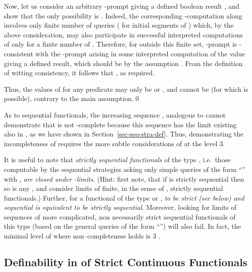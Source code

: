 \documentclass[fleqn]{LMCS}
\theoremstyle{plain}\newtheorem{satz}[thm]{Satz}
\theoremstyle{plain}\newtheorem{hyp}[thm]{Hypothesis}
\theoremstyle{plain}\newtheorem{hyps}[thm]{Hypotheses}
\theoremstyle{definition}\newtheorem{note}[thm]{Note}
\newcommand{\?}{\mbox{?}}
\begin{document}
Now, let us consider an arbitrary -prompt  giving a defined boolean result 
\linebreak
, and show that the only possibility is .  
Indeed, the corresponding -computation along 
involves only finite number of queries 
( for  initial segments of )
which, 
by the above consideration, 
may also participate in successful interpreted computations of  
only for a finite number of .  Therefore, for  outside this 
finite set, -prompt  
is -consistent with the -prompt  arising 
in some interpreted computation of the value  
giving a defined result, 
which should be  by the assumption . 
From the definition of witting consistency, 
it follows that , as required. 

Thus, the values of 
 for any predicate  
may only be  or , and  cannot be  
(for which  is possible), contrary to the main assumption.\qed


\bigskip


\noindent
As to sequential functionals, the 
increasing sequence , 
 analogous to  
cannot demonstrate that  is not -complete because 
this sequence 
has the limit  existing also in , as we 
have shown in Section~\ref{sec-seq-stra-def}. 
Thus, demonstrating the incompleteness of  
requires the more subtle considerations of \cite{Normann2004} at the level 3. 




It is useful to note that \emph{strictly sequential functionals} of
the type , i.e.\ those computable by the
sequential strategies asking only simple queries of the form
``'' with , \emph{are closed under -limits}.
(Hint: first note, that if  is strictly sequential then so is any
, and consider limits of finite, in the sense of
, strictly sequential functionals.)  Further, for
a functional of the type  or , \emph{to be strict {\em(see below)} and sequential is
equivalent to be strictly sequential}.  Moreover, looking for limits
of sequences of more complicated, non necessarily strict sequential
functionals of this type (based on the general queries of the form
``\mbox{}'') will also fail.  In fact, the minimal level of
 where non--completeness holds is 3
\cite{Normann2004}.


\subsection{Definability in \texorpdfstring{}{PCF+} 
of Strict Continuous Functionals 
\texorpdfstring{\mbox{}}{F:(i->i)->i}}
\label{sec:strict-functionals}
\end{document}
